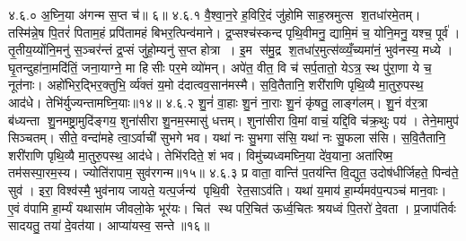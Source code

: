 ४.६.०
अ॒घ्नि॒या अ॑गन्म स॒प्त च॑॥ ६॥
४.६.१
वै॒श्वा॒न॒रे ह॒विरि॒दं जु॑होमि साह॒स्रमुत्स श॒तधा॑रमे॒तम्। तस्मि॑न्ने॒ष पि॒तरं॑ पिताम॒हं प्रपि॑तामहं बिभर॒त्पिन्व॑माने। द्र॒प्सश्च॑स्कन्द पृथि॒वीमनु॒ द्यामि॒मं च॒ योनि॒मनु॒ यश्च॒ पूर्व॑। तृ॒तीय॒य्योंनि॒मनु॑ स॒ञ्चर॑न्तं द्र॒प्सं जु॑हो॒म्यनु॑ स॒प्त होत्रा। इ॒म स॑मु॒द्र श॒तधा॑र॒मुत्स॑व्व्यँ॒च्यमा॑नं॒ भुव॑नस्य॒ मध्ये। घृ॒तन्दुहा॑ना॒मदि॑तिं॒ जना॒याग्ने॒ मा हिसीः पर॒मे व्यो॑मन्। अपे॑त॒ वीत॒ वि च॑ सर्प॒तातो॒ येऽत्र॒ स्थ पु॑रा॒णा ये च॒ नूत॑नाः। अहो॑भिर॒द्भिर॒क्तुभि॒ र्व्य॑क्तं य॒मो द॑दात्वव॒सान॑मस्मै। स॒वि॒तैतानि॒ शरी॑राणि पृथि॒व्यै मा॒तुरु॒पस्थ॒ आद॑धे। तेभि॑र्युज्यन्तामघ्नि॒याः॥१४॥
४.६.२
शु॒नं॑ वा॒हाः  शु॒नं ना॒राः  शु॒नं कृ॑षतु॒ लाङ्ग॑लम्। शु॒नं व॑र॒त्रा ब॑ध्यन्ता शु॒नमष्ट्रा॒मुदि॑ङ्गय॒ शुना॑सीरा शु॒नम॒स्मासु॑ धत्तम्। शुना॑सीरा वि॒मां वाचं॒ यद्दि॒वि च॑क्र॒थुः पय॑। तेने॒मामुप॑ सिञ्चतम्। सीते॒ वन्दा॑महे त्वा॒ऽर्वाची॑ सुभगे भव। यथा॑ नः सु॒भगा स॑सि॒ यथा॑ नः सु॒फला स॑सि। स॒वि॒तैतानि॒ शरी॑राणि पृथि॒व्यै मा॒तुरु॒पस्थ॒ आद॑धे। तेभि॑रदिते॒ शं भव। विमु॑च्यध्वमघ्नि॒या दे॑व॒याना॒ अता॑रिष्म॒ तम॑सस्पा॒रम॒स्य। ज्योति॑रापाम॒ सुव॑रगन्म॥१५॥
४.६.३
प्र वाता॒ वान्ति॑ प॒तय॑न्ति वि॒द्युत॒ उदोष॑धीर्जिहते॒ पिन्व॑ते॒ सुव॑। इरा॒ विश्व॑स्मै॒ भुव॑नाय जायते॒ यत्प॒र्जन्य॑ पृथि॒वी रेत॒साऽव॑ति। यथा॑ य॒माय॑ हा॒र्म्यमव॑प॒न्पञ्च॑ मान॒वाः। ए॒वं व॑पामि हा॒र्म्यं यथासा॑म जीवलो॒के भूर॑यः। चित॑ स्थ परि॒चित॑ ऊर्ध्व॒चितः  श्रयध्वं पि॒तरो॑ दे॒वता। प्र॒जाप॑तिर्वः सादयतु॒ तया॑ दे॒वत॑या। आप्या॑यस्व॒ सन्ते॥१६॥
\anuvakamend

